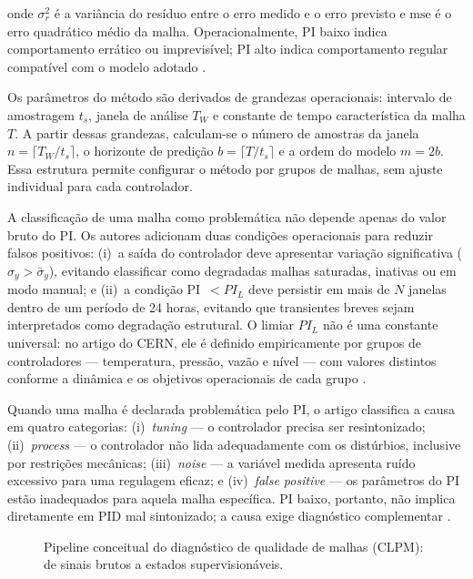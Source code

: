 \noindent onde $\sigma^2_r$ é a variância do resíduo entre o erro medido e o erro previsto e
$\text{mse}$ é o erro quadrático médio da malha. Operacionalmente, PI baixo indica comportamento
errático ou imprevisível; PI alto indica comportamento regular compatível com o modelo adotado
\cite{Bradu2018}.

Os parâmetros do método são derivados de grandezas operacionais: intervalo de amostragem $t_s$, janela de análise $T_W$ e constante de tempo característica da malha $T$. A partir dessas grandezas, calculam-se o número de amostras da janela $n = \lceil T_W/t_s \rceil$, o horizonte de predição $b = \lceil T/t_s \rceil$ e a ordem do modelo $m = 2b$. Essa estrutura permite configurar o método por grupos de malhas, sem ajuste individual para cada controlador.

A classificação de uma malha como problemática não depende apenas do valor bruto do PI. Os autores adicionam duas condições operacionais para reduzir falsos positivos: (i)~a saída do controlador deve apresentar variação significativa ($\sigma_y > \bar{\sigma}_y$), evitando classificar como degradadas malhas saturadas, inativas ou em modo manual; e (ii)~a condição PI~$< PI_L$ deve persistir em mais de $N$ janelas dentro de um período de 24 horas, evitando que transientes breves sejam interpretados como degradação estrutural. O limiar $PI_L$ não é uma constante universal: no artigo do CERN, ele é definido empiricamente por grupos de controladores --- temperatura, pressão, vazão e nível --- com valores distintos conforme a dinâmica e os objetivos operacionais de cada grupo \cite{Bradu2018}.

Quando uma malha é declarada problemática pelo PI, o artigo classifica a causa em quatro categorias: (i)~\textit{tuning} --- o controlador precisa ser resintonizado; (ii)~\textit{process} --- o controlador não lida adequadamente com os distúrbios, inclusive por restrições mecânicas; (iii)~\textit{noise} --- a variável medida apresenta ruído excessivo para uma regulagem eficaz; e (iv)~\textit{false positive} --- os parâmetros do PI estão inadequados para aquela malha específica. PI baixo, portanto, não implica diretamente em PID mal sintonizado; a causa exige diagnóstico complementar \cite{Bradu2018}.

\begin{figure}[htbp]
	\centering
	\caption{Pipeline conceitual do diagnóstico de qualidade de malhas (CLPM): de sinais brutos a estados supervisionáveis.}
	\label{fig:clpm_pipeline}
\end{figure}


